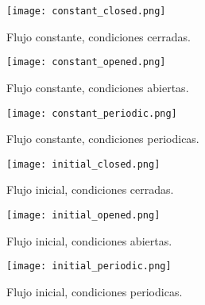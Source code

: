 \documentclass[]{article}
\begin{document}
\begin{figure}[!h]
{
    \texttt{[image: constant\_closed.png]}
    \caption{Flujo constante, condiciones cerradas.}
}
\end{figure}

\begin{figure}[!h]
{
    \texttt{[image: constant\_opened.png]}
    \caption{Flujo constante, condiciones abiertas.}
}
\end{figure}

\begin{figure}[!h]
{
    \texttt{[image: constant\_periodic.png]}
    \caption{Flujo constante, condiciones periodicas.}
}
\end{figure}

\begin{figure}[!h]
{
    \texttt{[image: initial\_closed.png]}
    \caption{Flujo inicial, condiciones cerradas.}
}
\end{figure}

\begin{figure}[!h]
{
    \texttt{[image: initial\_opened.png]}
    \caption{Flujo inicial, condiciones abiertas.}
}
\end{figure}

\begin{figure}[!h]
{
    \texttt{[image: initial\_periodic.png]}
    \caption{Flujo inicial, condiciones periodicas.}
}
\end{figure}
\end{document}
